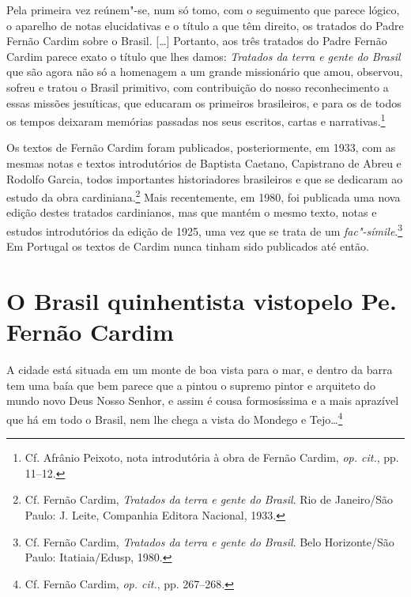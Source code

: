 \begin{hedraquote}
Pela primeira vez reúnem"-se, num só tomo, com o seguimento
que parece lógico, o aparelho de notas elucidativas e o título a que
têm direito, os tratados do Padre Fernão Cardim sobre o Brasil. [\ldots{}]
Portanto, aos três tratados do Padre Fernão Cardim parece exato o
título que lhes damos: \textit{Tratados da terra e gente do Brasil} 
que são agora não só a homenagem a um grande missionário que
amou, observou, sofreu e tratou o Brasil primitivo, com contribuição do
nosso reconhecimento a essas missões jesuíticas, que educaram os
primeiros brasileiros, e para os de todos os tempos deixaram memórias
passadas nos seus escritos, cartas e narrativas.\footnote{ Cf. Afrânio Peixoto, 
nota introdutória à obra de Fernão Cardim, \textit{op. cit.}, pp. 11--12.} 
\end{hedraquote}

 Os textos de Fernão Cardim foram publicados, posteriormente,
em 1933, com as mesmas notas e textos introdutórios de Baptista
Caetano, Capistrano de Abreu e Rodolfo Garcia, todos importantes
historiadores brasileiros e que se dedicaram ao estudo da obra
cardiniana.\footnote{ Cf. Fernão Cardim, \textit{Tratados da terra
e gente do Brasil}. Rio de Janeiro/São Paulo: J. Leite, Companhia
Editora Nacional, 1933.} Mais recentemente, em 1980, foi publicada uma nova
edição destes tratados cardinianos, mas que mantém o mesmo
texto, notas e estudos introdutórios da edição de 1925, uma vez que se
trata de um \textit{fac"-símile}.\footnote{ Cf. Fernão Cardim, \textit{Tratados
da terra e gente do Brasil}. Belo Horizonte/São Paulo: Itatiaia/Edusp, 1980.} 
Em Portugal os textos de Cardim nunca tinham sido publicados até então.

\section{O Brasil quinhentista visto\break pelo Pe. Fernão Cardim}

\begin{hedraquote}
A cidade está situada em um monte de boa vista para o mar,
e dentro da barra tem uma baía que bem parece que a pintou o supremo
pintor e arquiteto do mundo novo Deus Nosso Senhor, e assim é cousa
formosíssima e a mais aprazível que há em todo o Brasil, nem lhe chega
a vista do Mondego e Tejo\ldots{}\footnote{ Cf. Fernão Cardim,
\textit{op. cit.}, pp. 267--268.}
\end{hedraquote}
 
